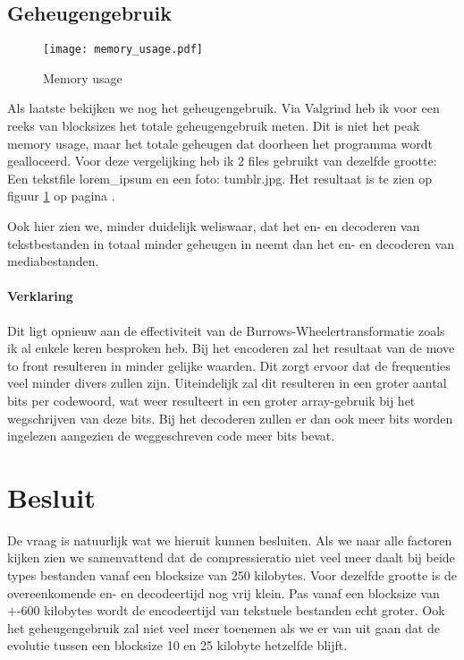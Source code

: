 \documentclass[11pt,a4paper]{article}
\begin{document}
\subsection{Geheugengebruik}
\begin{figure}[h!]
  \centering
    \texttt{[image: memory\_usage.pdf]}
    \caption{Memory usage}
  \label{mem}
\end{figure}
Als laatste bekijken we nog het geheugengebruik. Via Valgrind heb ik voor een reeks van blocksizes het totale geheugengebruik meten. Dit is niet het peak memory usage, maar het totale geheugen dat doorheen het programma wordt gealloceerd. Voor deze vergelijking heb ik 2 files gebruikt van dezelfde grootte: Een tekstfile lorem\_ipsum en een foto: tumblr.jpg. Het resultaat is te zien op figuur \ref{mem} op pagina \pageref{mem}.

Ook hier zien we, minder duidelijk weliswaar, dat het en- en decoderen van tekstbestanden in totaal minder geheugen in neemt dan het en- en decoderen van mediabestanden.

\paragraph*{Verklaring}
Dit ligt opnieuw aan de effectiviteit van de Burrows-Wheelertransformatie zoals ik al enkele keren besproken heb. Bij het encoderen zal het resultaat van de move to front resulteren in minder gelijke waarden. Dit zorgt ervoor dat de frequenties veel minder divers zullen zijn. Uiteindelijk zal dit resulteren in een groter aantal bits per codewoord, wat weer resulteert in een groter array-gebruik bij het wegschrijven van deze bits. Bij het decoderen zullen er dan ook meer bits worden ingelezen aangezien de weggeschreven code meer bits bevat.

\section{Besluit}
De vraag is natuurlijk wat we hieruit kunnen besluiten. Als we naar alle factoren kijken zien we samenvattend dat de compressieratio niet veel meer daalt bij beide types bestanden vanaf een blocksize van 250 kilobytes. Voor dezelfde grootte is de overeenkomende en- en decodeertijd nog vrij klein. Pas vanaf een blocksize van +-600 kilobytes wordt de encodeertijd van tekstuele bestanden echt groter. Ook het geheugengebruik zal niet veel meer toenemen als we er van uit gaan dat de evolutie tussen een blocksize 10 en 25 kilobyte hetzelfde blijft.\\
\end{document}
